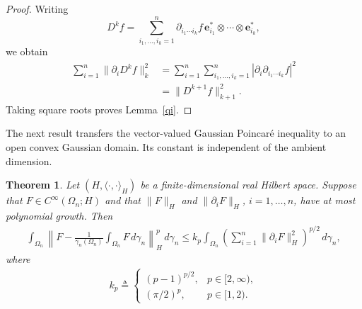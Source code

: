 \documentclass[12pt]{article}
\theoremstyle{plain}
\newtheorem{theorem}{Theorem}[section]
\theoremstyle{definition}
\theoremstyle{remark}
\numberwithin{equation}{section}
\begin{document}
\begin{proof}
Writing
\[
D^kf
=
\sum_{i_1,\ldots,i_k=1}^n
\partial_{i_1\cdots i_k}f\,
\mathbf e_{i_1}^*\otimes\cdots\otimes\mathbf e_{i_k}^*,
\]
we obtain
\[
\begin{aligned}
\sum_{i=1}^n\|\partial_iD^kf\|_k^2
&=
\sum_{i=1}^n\sum_{i_1,\ldots,i_k=1}^n
\left|\partial_i\partial_{i_1\cdots i_k}f\right|^2
\\
&=
\|D^{k+1}f\|_{k+1}^2.
\end{aligned}
\]
Taking square roots proves Lemma~\ref{qi}.
\end{proof}

The next result transfers the vector-valued Gaussian Poincar\'e inequality to an open convex Gaussian domain.  Its constant is independent of the ambient dimension.

\begin{theorem}\label{poincare}
Let $(H,\langle\cdot,\cdot\rangle_H)$ be a finite-dimensional real Hilbert space.  Suppose that $F\in C^\infty(\Omega_n;H)$ and that $\|F\|_H$ and $\|\partial_iF\|_H$, $i=1,\ldots,n$, have at most polynomial growth.  Then
\begin{eqnarray}
\int_{\Omega_n}
\left\|
F-
\frac{1}{\gamma_n(\Omega_n)}
\int_{\Omega_n}F\,d\gamma_n
\right\|_H^p
\,d\gamma_n
\leqslant
k_p
\int_{\Omega_n}
\left(
\sum_{i=1}^n\|\partial_iF\|_H^2
\right)^{p/2}
\,d\gamma_n,
\label{1}
\end{eqnarray}
where
\begin{eqnarray}
k_p
\triangleq
\begin{cases}
(p-1)^{p/2},&p\in[2,\infty),\\[2mm]
(\pi/2)^p,&p\in[1,2).
\end{cases}
\label{2}
\end{eqnarray}
\end{theorem}
\end{document}
